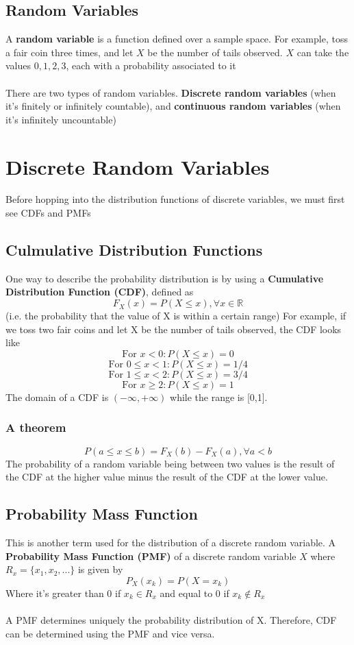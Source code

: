 \documentclass{article}
\begin{document}
\subsection{Random Variables}
A \textbf{random variable} is a function defined over a sample space. For example, toss a fair coin three times, and let $X$ be the number of tails observed. $X$ can take the values $0,1,2,3$, each with a probability associated to it
\\\\
There are two types of random variables. \textbf{Discrete random variables} (when it's finitely or infinitely countable), and \textbf{continuous random variables} (when it's infinitely uncountable)

\section{Discrete Random Variables}
Before hopping into the distribution functions of discrete variables, we must first see CDFs and PMFs
\subsection{Culmulative Distribution Functions}
One way to describe the probability distribution is by using a \textbf{Cumulative Distribution Function (CDF)}, defined as 
\[F_X(x) = P(X\leq x), \forall x\in \mathds{R}\]
(i.e. the probability that the value of X is within a certain range)
For example, if we toss two fair coins and let X be the number of tails observed, the CDF looks like
\[\text{For }x<0: P(X\leq x ) = 0\]
\[\text{For }0\leq x<1: P(X\leq x ) = 1/4\]
\[\text{For }1\leq x<2: P(X\leq x ) = 3/4\]
\[\text{For }x\geq2: P(X\leq x ) = 1\]
The domain of a CDF is $(-\infty,+\infty)$ while the range is [0,1].
\subsubsection{A theorem}
\[P(a\leq x\leq b)=F_X(b)-F_X(a), \forall a<b\]
The probability of a random variable being between two values is the result of the CDF at the higher value minus the result of the CDF at the lower value.
\subsection{Probability Mass Function}
This is another term used for the distribution of a discrete random variable. A \textbf{Probability Mass Function (PMF)} of a discrete random variable $X$ where $R_x =\{x_1,x_2,...\}$ is given by
\[P_X(x_k)=P(X=x_k)\]
Where it's greater than 0 if $x_k\in R_x$ and equal to 0 if $x_k\notin R_x$
\\\\
A PMF determines uniquely the probability distribution of X. Therefore, CDF can be determined using the PMF and vice versa.
\end{document}
